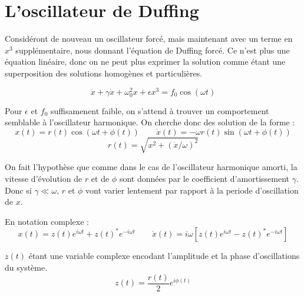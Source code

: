 \chapter{L'oscillateur de Duffing}

Considéront de nouveau un oscillateur forcé, mais maintenant avec un terme en $x^3$ supplémentaire, nous donnant l'équation de Duffing forcé. Ce n'est plus une équation linéaire, donc on ne peut plus exprimer la solution comme étant une superposition des solutions homogènes et particulières.


\begin{equation}
    \ddot{x} + \gamma \dot{x} + \omega_0^2 x + \epsilon x^3 = f_0 \cos(\omega t)
    \label{eq:duffing}
\end{equation}


Pour $\epsilon$ et $f_0$ suffisamenent faible, on s'attend à trouver un comportement semblable à l'oscillateur harmonique. 
On cherche donc des solution de la forme :
\begin{equation}
x(t) = r(t)\cos(\omega t + \phi(t)) \qquad \dot{x}(t) =  -\omega r(t)\sin(\omega t + \phi(t))
\label{eq:duff_x_xdot}
\end{equation}
\begin{equation*}
    r(t) = \sqrt{x^2 + (\dot{x}/\omega)^2}
\end{equation*}


On fait l'hypothèse que comme dans le cas de l'oscillateur harmonique amorti, 
la vitesse d'évolution de $r$ et de $\phi$ sont données par le coefficient d'amortissement $\gamma$. 
Donc si $\gamma \ll \omega$,  $r$ et $\phi$ vont varier
 lentement par rapport à la periode d'oscillation de $x$.

En notation complexe :
\begin{equation}
    x(t) = z(t)e^{i\omega t} + z(t)^* e^{-i\omega t}
    \qquad 
    \dot{x}(t) = i\omega \left[ z(t)e^{i\omega t} - z(t)^* e^{-i\omega t} \right]
\end{equation}


$z(t)$ étant une variable complexe encodant l'amplitude et la phase d'oscillations du système.
\[ z(t) = \frac{r(t)}{2}e^{i\phi(t)} \]

